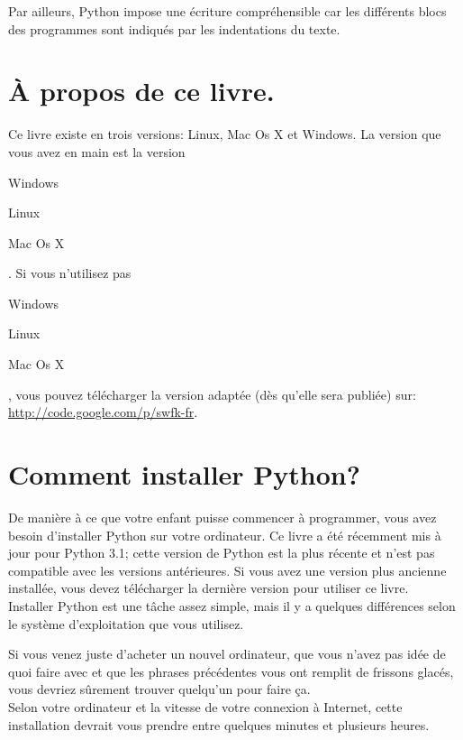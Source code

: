 Par ailleurs, Python impose une écriture compréhensible car les différents blocs des programmes sont indiqués par les indentations du texte.

\section*{À propos de ce livre.}

Ce livre existe en trois versions: Linux, Mac Os X et Windows. La version que vous avez en main est la version  \begin{WINDOWS}Windows\end{WINDOWS}\begin{LINUX}Linux\end{LINUX}\begin{MAC}Mac Os X\end{MAC}. Si vous n'utilisez pas \begin{WINDOWS}Windows\end{WINDOWS}\begin{LINUX}Linux\end{LINUX}\begin{MAC}Mac Os X\end{MAC}, vous pouvez télécharger la version adaptée (dès qu'elle sera publiée) sur: \url{http://code.google.com/p/swfk-fr}.
\\
\bigskip
\section*{Comment installer Python?}
De manière à ce que votre enfant puisse commencer à programmer, vous avez besoin d'installer Python sur votre ordinateur. Ce livre a été récemment mis à jour pour Python 3.1; cette version de Python est la plus récente et n'est pas compatible avec les versions antérieures. Si vous avez une version plus ancienne installée, vous devez télécharger la dernière version pour utiliser ce livre.
\\


Installer Python est une tâche assez simple, mais il y a quelques différences selon le système d'exploitation que vous utilisez. 


Si vous venez juste d'acheter un nouvel ordinateur, que vous n'avez pas idée de quoi faire avec et que les phrases précédentes vous ont remplit de frissons glacés, vous devriez sûrement trouver quelqu'un pour faire ça.
\\


Selon votre ordinateur et la vitesse de votre connexion à Internet, cette installation devrait vous prendre entre quelques minutes et plusieurs heures.

